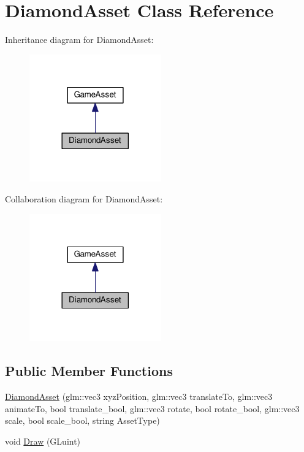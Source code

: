 \hypertarget{class_diamond_asset}{}\section{Diamond\+Asset Class Reference}
\label{class_diamond_asset}


Inheritance diagram for Diamond\+Asset\+:
\nopagebreak
\begin{figure}[H]
\begin{center}
\leavevmode
\includegraphics[width=161pt]{class_diamond_asset__inherit__graph}
\end{center}
\end{figure}


Collaboration diagram for Diamond\+Asset\+:
\nopagebreak
\begin{figure}[H]
\begin{center}
\leavevmode
\includegraphics[width=161pt]{class_diamond_asset__coll__graph}
\end{center}
\end{figure}
\subsection*{Public Member Functions}
\begin{DoxyCompactItemize}
\item 
\hyperlink{class_diamond_asset_a297efbf3312ce0efba79f055a076481c}{Diamond\+Asset} (glm\+::vec3 xyz\+Position, glm\+::vec3 translate\+To, glm\+::vec3 animate\+To, bool translate\+\_\+bool, glm\+::vec3 rotate, bool rotate\+\_\+bool, glm\+::vec3 scale, bool scale\+\_\+bool, string Asset\+Type)
\item 
void \hyperlink{class_diamond_asset_a0c259031894623285b3b511321c73abb}{Draw} (G\+Luint)
\end{DoxyCompactItemize}


